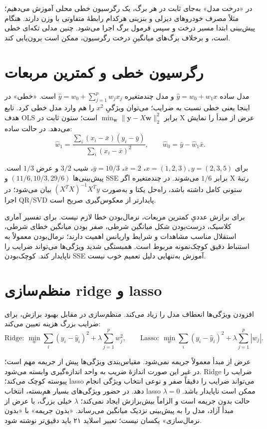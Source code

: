 \documentclass[12pt,a4paper,oneside]{report}
\newcounter{ex}[chapter]
\begin{document}
در «درخت مدل» به‌جای ثابت در هر برگ، یک رگرسیون خطی محلی آموزش می‌دهیم؛ مثلاً مصرف خودروهای دیزلی و بنزینی هرکدام رابطهٔ متفاوتی با وزن دارند. هنگام پیش‌بینی ابتدا مسیر درخت و سپس فرمول برگ اجرا می‌شود. چنین مدلی تکه‌ای خطی است، و برخلاف برگ‌های میانگینِ درخت رگرسیون، ممکن است برون‌یابی کند.

\section{رگرسیون خطی و کمترین مربعات}

مدل ساده \(\widehat y=w_0+w_1x\) و مدل چندمتغیره \(\widehat y=w_0+\sum_{j=1}^p w_jx_j\) است. «خطی» در اینجا یعنی خطی نسبت به ضرایب؛ می‌توان ویژگیِ \(x^2\) را هم وارد مدل خطی کرد. تابع هدف OLS برابر \(\min_{\boldsymbol w}\|\boldsymbol y-X\boldsymbol w\|_2^2\) است؛ ستون ثابت در X عرض از مبدأ را نمایش می‌دهد. در حالت ساده: \[
\widehat w_1=\frac{\sum_i(x_i-\bar x)(y_i-\bar y)}{\sum_i(x_i-\bar x)^2},
\qquad \widehat w_0=\bar y-\widehat w_1\bar x.
\]

برای \(x=(1,2,3),y=(2,3,5)\)، \(\bar x=2\)، \(\bar y=10/3\)، شیب \(3/2\) و عرض \(1/3\) است. پیش‌بینی‌ها \((11/6,10/3,29/6)\) و SSE برابر \(1/6\) می‌شوند. در چندمتغیره اگر X رتبهٔ ستونی کامل داشته باشد، راه‌حل یکتا و به‌صورت \((X^TX)^{-1}X^Ty\) بیان می‌شود؛ در اجرا QR/SVD پایدارتر از معکوس‌گیری صریح است.

برای برازش عددیِ کمترین مربعات، نرمال‌بودن خطا لازم نیست. برای تفسیر آماری کلاسیک، درست‌بودن شکل میانگین شرطی، صفر بودن میانگین خطای شرطی، استقلال مناسب مشاهدات و شرایط واریانس اهمیت دارند؛ نرمال‌بودن معمولاً به استنباط دقیق کوچک‌نمونه مربوط است. همبستگی شدید ویژگی‌ها می‌تواند ضرایب را ناپایدار کند. کوچک‌بودن SSE آموزش به‌تنهایی دلیل تعمیم خوب نیست.

\section{منظم‌سازی ridge و lasso}

افزودن ویژگی‌ها انعطاف مدل را زیاد می‌کند. منظم‌سازی در مقابل بهبود برازش، برای ضرایب بزرگ هزینه تعیین می‌کند: \[
\text{Ridge}:\ \min_w \sum_i(y_i-\widehat y_i)^2+\lambda\sum_{j=1}^p w_j^2,
\qquad
\text{Lasso}:\ \min_w \sum_i(y_i-\widehat y_i)^2+\lambda\sum_{j=1}^p|w_j|.
\]

عرض از مبدأ معمولاً جریمه نمی‌شود. مقیاس‌بندی ویژگی‌ها پیش از جریمه مهم است؛ در غیر این صورت اندازهٔ ضریب به واحد اندازه‌گیری وابسته می‌شود. Ridge ضرایب را پیوسته کوچک می‌کند؛ lasso می‌تواند ضرایب را دقیقاً صفر و نوعی انتخاب ویژگی انجام دهد. در حضور ویژگی‌های بسیار هم‌بسته، انتخاب lasso ممکن است ناپایدار باشد. \(\lambda=0\) حالت بدون جریمه است و الزاماً بیش‌برازش ایجاد نمی‌کند؛ \(\lambda\) خیلی بزرگ، با عرض از مبدأ آزاد، مدل را به پیش‌بینی نزدیک میانگین می‌رساند. «بدون جریمه» با «بدون نرمال‌سازی» یکسان نیست؛ تعبیر اسلاید ۲۱ باید دقیق‌تر نوشته شود.
\end{document}
